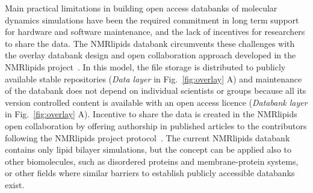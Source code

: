 \documentclass[fleqn,10pt]{wlscirep}
\begin{document}
Main practical limitations in building open access databanks of molecular dynamics simulations have been the required commitment in long term support for hardware and software maintenance, and the lack of incentives for researchers to share the data. The NMRlipids databank circumvents these challenges with the overlay databank design and open collaboration approach developed in the NMRlipids project~\cite{botan15}. In this model, the file storage is distributed to publicly available stable repositories ({\it Data layer} in Fig.~\ref{fig:overlay} A) and maintenance of the databank does not depend on individual scientists or groups because all its version controlled content is available with an open access licence ({\it Databank layer} in Fig.~\ref{fig:overlay} A). 
%
Incentive to share the data is created in the NMRlipids open collaboration by offering authorship in published articles to the contributors following the NMRlipids project protocol~\cite{botan15}.
%
%
%
The current NMRlipids databank contains only lipid bilayer simulations, but the concept can be applied also to other biomolecules, such as disordered proteins and membrane-protein systems,
or other fields where similar barriers to establish publicly accessible databanks exist. 

%
\end{document}
